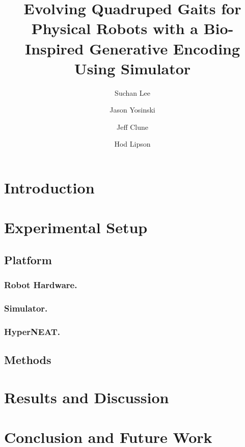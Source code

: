 \documentclass{llncs}
\begin{document}
%
\title{Evolving Quadruped Gaits for Physical Robots with a Bio-Inspired Generative Encoding Using Simulator}
\author{Suchan Lee \and Jason Yosinski \and Jeff Clune \and Hod Lipson}
\maketitle
%
%
%
%
\begin{abstract}

\end{abstract}
%
%
\section{Introduction}

%
%
\section{Experimental Setup}
\subsection{Platform}
\subsubsection{Robot Hardware.}

\subsubsection{Simulator.}

\subsubsection{HyperNEAT.}

\subsection{Methods}

%
%
\section{Results and Discussion}

%
%
\section{Conclusion and Future Work}

%
%
\begin{thebibliography}{1}

\end{thebibliography}
%
%
\end{document}
